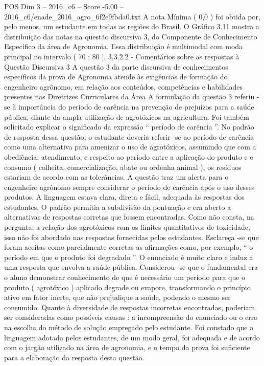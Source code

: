 \begin{textsample}{POS Dim 3 – 2016\_c6 – Score -5.00 – 2016\_c6/enade\_2016\_agro\_6f2e9fbda0.txt}
A nota Mínima ( 0,0 ) foi obtida por, pelo menos, um estudante em todas as regiões do Brasil.
O Gráfico 3.11 mostra a distribuição das notas na questão discursiva 3, do Componente de Conhecimento Específico da área de Agronomia.
Essa distribuição é multimodal com moda principal no intervalo ( 70 ; 80 ]. 3.3.2.2 - Comentários sobre as respostas à Questão Discursiva 3 A questão 3 da parte discursiva de conhecimentos específicos da prova de Agronomia atende às exigências de formação do engenheiro agrônomo, em relação aos conteúdos, competências e habilidades presentes nas Diretrizes Curriculares da Área A formulação da questão 3 referiu -se à importância do período de carência na prevenção de prejuízos para a saúde pública, diante da ampla utilização de agrotóxicos na agricultura.
Foi também solicitado explicar o significado da expressão “ período de carência ”.
No padrão de resposta dessa questão, o estudante deveria referir -se ao período de carência como uma alternativa para amenizar o uso de agrotóxicos, assumindo que com a obediência, atendimento, e respeito ao período entre a aplicação do produto e o consumo ( colheita, comercialização, abate ou ordenha animal ), os resíduos estariam de acordo com as tolerâncias.
A questão traz um alerta para o engenheiro agrônomo sempre considerar o período de carência após o uso desses produtos.
A linguagem estava clara, direta e fácil, adequada às respostas dos estudantes.
O padrão permitia a subdivisão da pontuação e era aberto a alternativas de respostas corretas que fossem encontradas.
Como não consta, na pergunta, a relação dos agrotóxicos com os limites quantitativos de toxicidade, isso não foi abordado nas respostas fornecidas pelos estudantes.
Esclareça -se que foram aceitas como parcialmente corretas as afirmações como, por exemplo, “ o período em que o produto foi degradado ”.
O enunciado é muito claro e induz a uma resposta que envolva a saúde pública.
Considerou -se que o fundamental era o aluno demonstrar conhecimento de que é necessário um período para que o produto ( agrotóxico ) aplicado degrade ou evapore, transformando o princípio ativo em fator inerte, que não prejudique a saúde, podendo o mesmo ser consumido.
Quanto à diversidade de respostas incorretas encontradas, poderiam ser consideradas como possíveis causas : a incompreensão do enunciado ou o erro na escolha do método de solução empregado pelo estudante.
Foi constado que a linguagem adotada pelos estudantes, de um modo geral, foi adequada e de acordo com o jargão utilizado na área de agronomia, e o tempo da prova foi suficiente para a elaboração da resposta desta questão.

\end{textsample}
